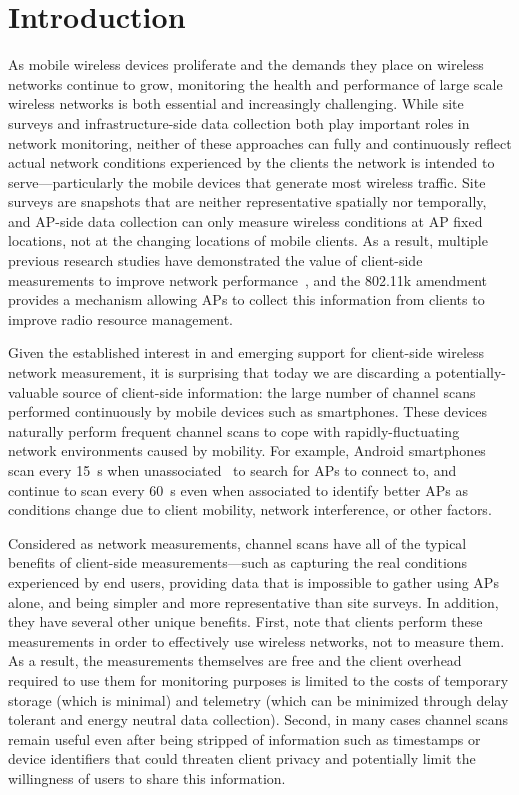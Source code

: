 \section{Introduction}
\label{sec-introduction}

As mobile wireless devices proliferate and the demands they place on wireless
networks continue to grow, monitoring the health and performance of large
scale wireless networks is both essential and increasingly challenging. While
site surveys and infrastructure-side data collection both play important
roles in network monitoring, neither of these approaches can fully and
continuously reflect actual network conditions experienced by the clients the
network is intended to serve---particularly the mobile devices that generate
most wireless traffic. Site surveys are snapshots that are neither
representative spatially nor temporally, and AP-side data collection can only
measure wireless conditions at AP fixed locations, not at the changing
locations of mobile clients. As a result, multiple previous research studies
have demonstrated the value of client-side measurements to improve network
performance~\cite{mishra2005weighted,mishra2006client}, and the 802.11k
amendment~\cite{80211k} provides a mechanism allowing APs to collect this
information from clients to improve radio resource management.

Given the established interest in and emerging support for client-side wireless
network measurement, it is surprising that today we are discarding a
potentially-valuable source of client-side information: the large number of
channel scans performed continuously by mobile devices such as smartphones.
These devices naturally perform frequent channel scans to cope with
rapidly-fluctuating network environments caused by mobility. For example,
Android smartphones scan every 15~s when unassociated~\cite{hanover2014cutting}
to search for APs to connect to, and continue to scan every 60~s even when
associated to identify better APs as conditions change due to client mobility,
network interference, or other factors.

Considered as network measurements, channel scans have all of the typical
benefits of client-side measurements---such as capturing the real conditions
experienced by end users, providing data that is impossible to gather using
APs alone, and being simpler and more representative than site surveys. In
addition, they have several other unique benefits. First, note that clients
perform these measurements in order to effectively use wireless networks, not
to measure them. As a result, the measurements themselves are free and the
client overhead required to use them for monitoring purposes is limited to
the costs of temporary storage (which is minimal) and telemetry (which can be
minimized through delay tolerant and energy neutral data collection). Second,
in many cases channel scans remain useful even after being stripped of
information such as timestamps or device identifiers that could threaten
client privacy and potentially limit the willingness of users to share this
information.

